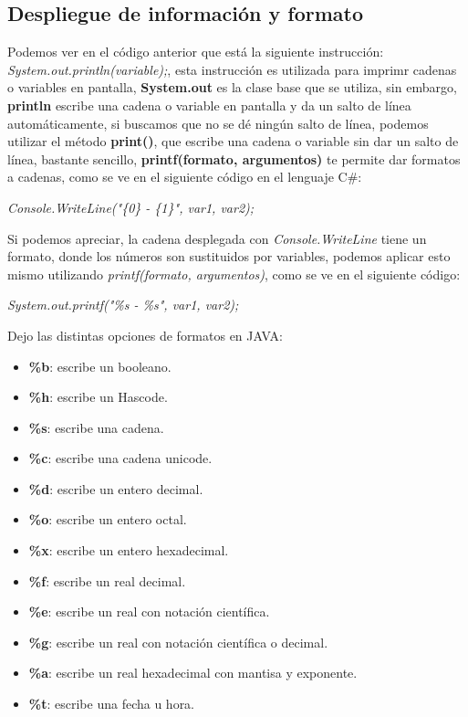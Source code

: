 \subsection{Despliegue de información y formato}
Podemos ver en el código anterior que está la siguiente instrucción: \textit{System.out.println(variable);}, esta instrucción es utilizada para imprimr cadenas o variables en pantalla, \textbf{System.out} es la clase base que se utiliza, sin embargo, \textbf{println} escribe una cadena o variable en pantalla y da un salto de línea automáticamente, si buscamos que no se dé ningún salto de línea, podemos utilizar el método \textbf{print()}, que escribe una cadena o variable sin dar un salto de línea, bastante sencillo, \textbf{printf(formato, argumentos)} te permite dar formatos a cadenas, como se ve en el siguiente código en el lenguaje C\#:
\begin{center}\textit{Console.WriteLine("\{0\} - \{1\}", var1, var2);}\end{center}
Si podemos apreciar, la cadena desplegada con \textit{Console.WriteLine} tiene un formato, donde los números son sustituidos por variables, podemos aplicar esto mismo utilizando \textit{printf(formato, argumentos)}, como se ve en el siguiente código:
\begin{center}\textit{System.out.printf("\%s - \%s", var1, var2);}\end{center}
Dejo las distintas opciones de formatos en JAVA:
\begin{itemize}
	\item \textbf{\%b}: escribe un booleano.
	\item \textbf{\%h}: escribe un Hascode.
	\item \textbf{\%s}: escribe una cadena.
	\item \textbf{\%c}: escribe una cadena unicode.
	\item \textbf{\%d}: escribe un entero decimal.
	\item \textbf{\%o}: escribe un entero octal.
	\item \textbf{\%x}: escribe un entero hexadecimal.
	\item \textbf{\%f}: escribe un real decimal.
	\item \textbf{\%e}: escribe un real con notación científica.
	\item \textbf{\%g}: escribe un real con notación científica o decimal.
	\item \textbf{\%a}: escribe un real hexadecimal con mantisa y exponente.
	\item \textbf{\%t}: escribe una fecha u hora.
\end{itemize}

